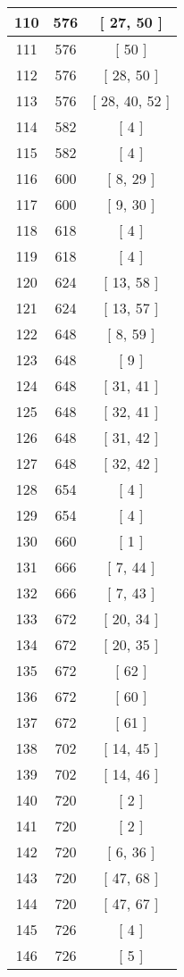 \begin{center}
\begin{longtable}[H]{|| c c c ||}
\hline
110 & 576 & [ 27, 50 ] \\ 
\hline
111 & 576 & [ 50 ] \\ 
\hline
112 & 576 & [ 28, 50 ] \\ 
\hline
113 & 576 & [ 28, 40, 52 ] \\ 
\hline
114 & 582 & [ 4 ] \\ 
\hline
115 & 582 & [ 4 ] \\ 
\hline
116 & 600 & [ 8, 29 ] \\ 
\hline
117 & 600 & [ 9, 30 ] \\ 
\hline
118 & 618 & [ 4 ] \\ 
\hline
119 & 618 & [ 4 ] \\ 
\hline
120 & 624 & [ 13, 58 ] \\ 
\hline
121 & 624 & [ 13, 57 ] \\ 
\hline
122 & 648 & [ 8, 59 ] \\ 
\hline
123 & 648 & [ 9 ] \\ 
\hline
124 & 648 & [ 31, 41 ] \\ 
\hline
125 & 648 & [ 32, 41 ] \\ 
\hline
126 & 648 & [ 31, 42 ] \\ 
\hline
127 & 648 & [ 32, 42 ] \\ 
\hline
128 & 654 & [ 4 ] \\ 
\hline
129 & 654 & [ 4 ] \\ 
\hline
130 & 660 & [ 1 ] \\ 
\hline
131 & 666 & [ 7, 44 ] \\ 
\hline
132 & 666 & [ 7, 43 ] \\ 
\hline
133 & 672 & [ 20, 34 ] \\ 
\hline
134 & 672 & [ 20, 35 ] \\ 
\hline
135 & 672 & [ 62 ] \\ 
\hline
136 & 672 & [ 60 ] \\ 
\hline
137 & 672 & [ 61 ] \\ 
\hline
138 & 702 & [ 14, 45 ] \\ 
\hline
139 & 702 & [ 14, 46 ] \\ 
\hline
140 & 720 & [ 2 ] \\ 
\hline
141 & 720 & [ 2 ] \\ 
\hline
142 & 720 & [ 6, 36 ] \\ 
\hline
143 & 720 & [ 47, 68 ] \\ 
\hline
144 & 720 & [ 47, 67 ] \\ 
\hline
145 & 726 & [ 4 ] \\ 
\hline
146 & 726 & [ 5 ] \\ 

\end{longtable}
\end{center}
